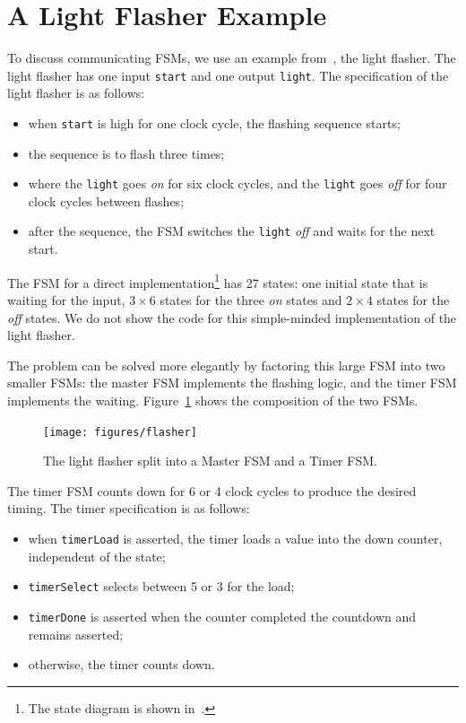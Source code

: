 \documentclass[%
    10pt,
    headinclude, footexclude,
    openright, %
    notitlepage,
    cleardoubleempty,
    headsepline,
    pointlessnumbers,
    bibtotoc, idxtotoc,
    ]{scrbook}
\newcommand{\code}[1]{{\small{\texttt{#1}}}}
\begin{document}
\section{A Light Flasher Example}

To discuss communicating FSMs, we use an example
from~\cite[Chapter~17]{dally:vhdl:2016}, the light flasher.
The light flasher has one input \code{start} and one output
\code{light}. The specification of the light flasher is as follows:
\begin{itemize}
\item when \code{start} is high for one clock cycle, the flashing
sequence starts;
\item the sequence is to flash three times;
\item where the \code{light} goes \emph{on} for six clock cycles, and the \code{light} goes \emph{off} for four clock cycles between flashes;
\item after the sequence, the FSM switches the \code{light} \emph{off} and waits
for the next start.
\end{itemize}

The FSM for a direct implementation\footnote{The state diagram is shown
in~\cite[p.~376]{dally:vhdl:2016}.} has 27 states:
one initial state that is waiting for the input, $3 \times 6$ states for the three
\emph{on} states and $2 \times 4$ states for the \emph{off} states.
We do not show the code for this simple-minded implementation of the light
flasher.

The problem can be solved more elegantly by factoring this large FSM into
two smaller FSMs: the master FSM implements the flashing logic, and the timer FSM
implements the waiting. Figure~\ref{fig:flasher} shows the composition of
the two FSMs.

\begin{figure}
  \centering
  \texttt{[image: figures/flasher]}
  \caption{The light flasher split into a Master FSM and a Timer FSM.}
  \label{fig:flasher}
\end{figure}

The timer FSM counts down for 6 or 4 clock cycles to produce the desired timing.
The timer specification is as follows:

\begin{itemize}
\item when \code{timerLoad} is asserted, the timer loads a value into the down counter,
independent of the state;
\item \code{timerSelect} selects between 5 or 3 for the load;
\item \code{timerDone} is asserted when the counter completed the countdown
and remains asserted;
\item otherwise, the timer counts down.
\end{itemize}
\end{document}
